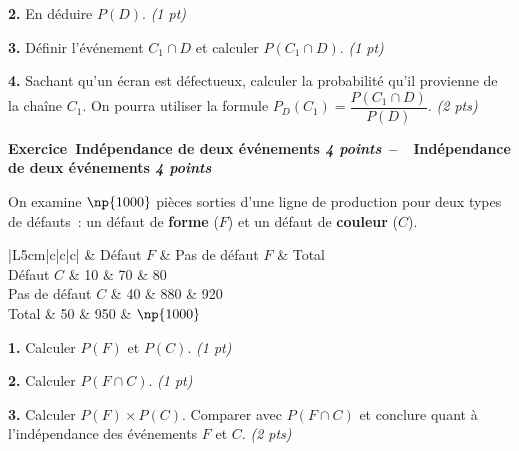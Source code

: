 \documentclass[11pt,a4paper]{article}
\newcommand{\cadreblanc}[1]{%
\medskip\framebox[\linewidth][c]{%
\rule{0mm}{#1mm}}\par
\medskip}
\newcounter{numexos}
\newcommand{\bex}[2]{%
\def\bextitle{#1}%
\addtocounter{numexos}{1}%
\begin{tcolorbox}[colback=white,colframe=black!30,arc=3pt,boxrule=0.6pt,
  left=4mm,right=4mm,top=1mm,bottom=2mm]%
  \textbf{Exercice~\thenumexos\ifx\bextitle\empty\else~--~~#1\fi}\par
  #2%
\end{tcolorbox}}
\renewcommand{\arraystretch}{1.6}
\begin{document}
\textbf{2.} En déduire $P(D)$. \hfill \textit{(1 pt)}

\cadreblanc{15}

\textbf{3.} Définir l'événement $C_1 \cap D$ et calculer $P(C_1 \cap D)$. \hfill \textit{(1 pt)}

\cadreblanc{18}

\textbf{4.} Sachant qu'un écran est défectueux, calculer la probabilité qu'il provienne de la chaîne $C_1$.
On pourra utiliser la formule $P_D(C_1)=\dfrac{P(C_1 \cap D)}{P(D)}$. \hfill \textit{(2 pts)}

\cadreblanc{22}

\vspace{4mm}

\bex{Indépendance de deux événements \hfill \normalfont\textit{4 points}}{%
\smallskip
On examine $\np{1000}$ pièces sorties d'une ligne de production pour deux types de défauts~: un défaut de \textbf{forme} ($F$) et un défaut de \textbf{couleur} ($C$).

\begin{center}
\renewcommand{\arraystretch}{1.8}
\begin{tabular}{|L{5cm}|c|c|c|}
\hline
 & Défaut $F$ & Pas de défaut $F$ & Total \\
\hline
Défaut $C$ & 10 & 70 & 80 \\
\hline
Pas de défaut $C$ & 40 & 880 & 920 \\
\hline
Total & 50 & 950 & $\np{1000}$ \\
\hline
\end{tabular}
\end{center}
}

\textbf{1.} Calculer $P(F)$ et $P(C)$. \hfill \textit{(1 pt)}

\cadreblanc{14}

\textbf{2.} Calculer $P(F \cap C)$. \hfill \textit{(1 pt)}

\cadreblanc{14}

\textbf{3.} Calculer $P(F) \times P(C)$. Comparer avec $P(F \cap C)$ et conclure quant à l'indépendance des événements $F$ et $C$. \hfill \textit{(2 pts)}

\cadreblanc{22}
\end{document}
